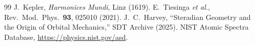 
\begin{thebibliography}{99}
 J.~Kepler, \emph{Harmonices Mundi}, Linz (1619).
 E.~Tiesinga \emph{et al.}, Rev.\ Mod.\ Phys.\ \textbf{93}, 025010 (2021).
 J.~C.~Harvey, ``Steradian Geometry and the Origin of Orbital Mechanics,'' SDT Archive (2025).
 NIST Atomic Spectra Database, \url{https://physics.nist.gov/asd}.
\end{thebibliography}


